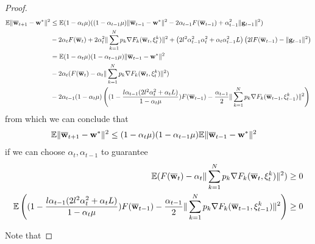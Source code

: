 \begin{proof}
	\begin{align*}
	\mathbb{E}\|{\overline{\mathbf{w}}}_{t+1}-{\mathbf{w}}^{\ast}\|^{2} & \leq\mathbb{E}(1-\alpha_{t}\mu)((1-\alpha_{t-1}\mu)\|{\overline{\mathbf{w}}}_{t-1}-{\mathbf{w}}^{\ast}\|^{2}-2\alpha_{t-1}F({\overline{\mathbf{w}}}_{t-1})+\alpha_{t-1}^{2}\|{\mathbf{g}}_{t-1}\|^{2})\\
	& -2\alpha_{t}F({\overline{\mathbf{w}}}_{t})+2\alpha_{t}^{2}\|\sum_{k=1}^{N}p_{k}\nabla F_{k}({\overline{\mathbf{w}}}_{t},\xi_{t}^{k})\|^{2}+\left(2l^{2}\alpha_{t-1}^{2}\alpha_{t}^{2}+\alpha_{t}\alpha_{t-1}^{2}L\right)\left(2lF({\overline{\mathbf{w}}}_{t-1})-\|{\mathbf{g}}_{t-1}\|^{2}\right)\\
	& =\mathbb{E}(1-\alpha_{t}\mu)(1-\alpha_{t-1}\mu)\|{\overline{\mathbf{w}}}_{t-1}-{\mathbf{w}}^{\ast}\|^{2}\\
	& -2\alpha_{t}(F({\overline{\mathbf{w}}}_{t})-\alpha_{t}\|\sum_{k=1}^{N}p_{k}\nabla F_{k}({\overline{\mathbf{w}}}_{t},\xi_{t}^{k})\|^{2})\\
	& -2\alpha_{t-1}(1-\alpha_{t}\mu)\left((1-\frac{l\alpha_{t-1}(2l^{2}\alpha_{t}^{2}+\alpha_{t}L)}{1-\alpha_{t}\mu})F({\overline{\mathbf{w}}}_{t-1})-\frac{\alpha_{t-1}}{2}\|\sum_{k=1}^{N}p_{k}\nabla F_{k}({\overline{\mathbf{w}}}_{t-1},\xi_{t-1}^{k})\|^{2}\right)
	\end{align*}
	from which we can conclude that 
	\begin{align*}
	\mathbb{E}\|{\overline{\mathbf{w}}}_{t+1}-{\mathbf{w}}^{\ast}\|^{2} & \leq(1-\alpha_{t}\mu)(1-\alpha_{t-1}\mu)\mathbb{E}\|{\overline{\mathbf{w}}}_{t-1}-{\mathbf{w}}^{\ast}\|^{2}
	\end{align*}
	if we can choose $\alpha_{t},\alpha_{t-1}$ to guarantee
	\begin{align*}
	\mathbb{E}(F({\overline{\mathbf{w}}}_{t})-\alpha_{t}\|\sum_{k=1}^{N}p_{k}\nabla F_{k}({\overline{\mathbf{w}}}_{t},\xi_{t}^{k})\|^{2}) & \geq0\\
	\mathbb{E}\left((1-\frac{l\alpha_{t-1}(2l^{2}\alpha_{t}^{2}+\alpha_{t}L)}{1-\alpha_{t}\mu})F({\overline{\mathbf{w}}}_{t-1})-\frac{\alpha_{t-1}}{2}\|\sum_{k=1}^{N}p_{k}\nabla F_{k}({\overline{\mathbf{w}}}_{t-1},\xi_{t-1}^{k})\|^{2}\right) & \geq0
	\end{align*}
	
	Note that 
	

\end{proof}
